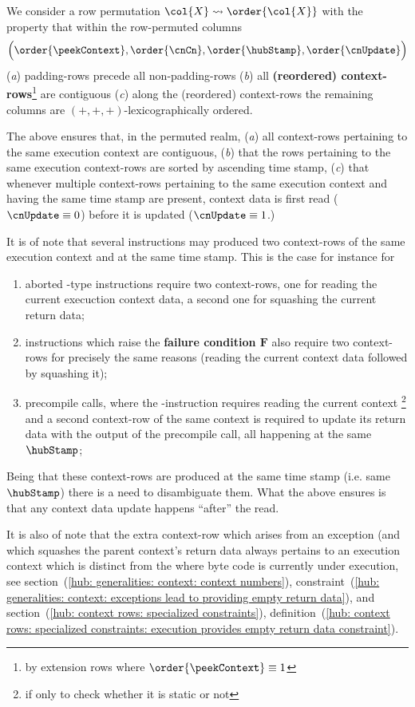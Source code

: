 We consider a row permutation $\col{X}\rightsquigarrow\order{\col{X}}$ with the property that within the row-permuted columns
\[
	\Big(
	\order{\peekContext},
	\order{\cnCn},
	\order{\hubStamp},
	\order{\cnUpdate}
	\Big)
\]
(\emph{a}) padding-rows precede all non-padding-rows
(\emph{b}) all \textbf{(reordered) context-rows}\footnote{by extension rows where $\order{\peekContext} \equiv 1$} are contiguous
(\emph{c}) along the (reordered) context-rows the remaining columns are $(+, +, +)$-lexicographically ordered.

\saNote{}
The above ensures that, in the permuted realm,
(\emph{a}) all context-rows pertaining to the same execution context are contiguous,
(\emph{b}) that the rows pertaining to the same execution context-rows are sorted by ascending time stamp,
(\emph{c}) that whenever multiple context-rows pertaining to the same execution context and having the same time stamp are present,
context data is first read ($\cnUpdate \equiv 0$) before it is updated ($\cnUpdate \equiv 1$.)

\saNote{}
It is of note that several instructions may produced two context-rows of the same execution context and at the same time stamp.
This is the case for instance for
\begin{enumerate}
	\item
		aborted -type instructions require two context-rows,
		one for reading the current execuction context data,
		a second one for squashing the current return data;
	\item
		 instructions which raise the \textbf{failure condition $\bm{F}$}
		also require two context-rows for precisely the same reasons
		(reading the current context data followed by squashing it);
        \item
		precompile calls, where the -instruction requires reading the current context%
		\footnote{if only to check whether it is static or not}
		and a second context-row of the same context is required to update its return data with the
		output of the precompile call, all happening at the same $\hubStamp$;
\end{enumerate}
Being that these context-rows are produced at the same time stamp (i.e. same $\hubStamp$) there is a need to disambiguate them.
What the above ensures is that any context data update happens ``after'' the read.

\saNote{}
It is also of note that the extra context-row which arises from an exception (and which squashes the parent context's return data
always pertains to an execution context which is distinct from the where byte code is currently under execution, see
section~(\ref{hub: generalities: context: context numbers}),
constraint~(\ref{hub: generalities: context: exceptions lead to providing empty return data}), and
section~(\ref{hub: context rows: specialized constraints}),
definition~(\ref{hub: context rows: specialized constraints: execution provides empty return data constraint}).
